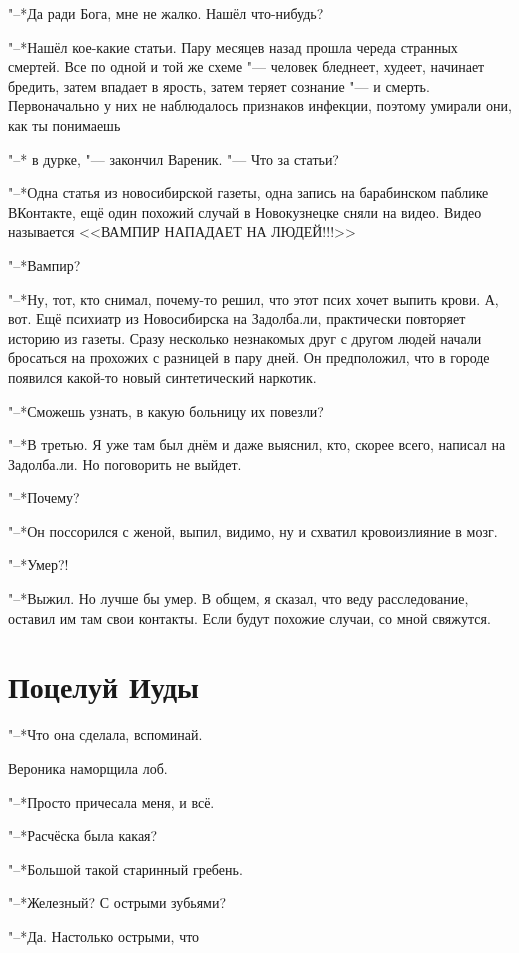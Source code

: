 "--*Да ради Бога, мне не жалко.
Нашёл что-нибудь?

"--*Нашёл кое-какие статьи.
Пару месяцев назад прошла череда странных смертей.
Все по одной и той же схеме "--- человек бледнеет, худеет, начинает бредить, затем впадает в ярость, затем теряет сознание "--- и смерть.
Первоначально у них не наблюдалось признаков инфекции, поэтому умирали они, как ты понимаешь\ldotst

"--* \ldotst в дурке, "--- закончил Вареник.
"--- Что за статьи?

"--*Одна статья из новосибирской газеты, одна запись на барабинском паблике ВКонтакте, ещё один похожий случай в Новокузнецке сняли на видео.
Видео называется <<ВАМПИР НАПАДАЕТ НА ЛЮДЕЙ!!!>>

"--*Вампир?

"--*Ну, тот, кто снимал, почему-то решил, что этот псих хочет выпить крови.
А, вот.
Ещё психиатр из Новосибирска на Задолба.ли, практически повторяет историю из газеты.
Сразу несколько незнакомых друг с другом людей начали бросаться на прохожих с разницей в пару дней.
Он предположил, что в городе появился какой-то новый синтетический наркотик.

"--*Сможешь узнать, в какую больницу их повезли?

"--*В третью.
Я уже там был днём и даже выяснил, кто, скорее всего, написал на Задолба.ли.
Но поговорить не выйдет.

"--*Почему?

"--*Он поссорился с женой, выпил, видимо, ну и схватил кровоизлияние в мозг.

"--*Умер?!

"--*Выжил.
Но лучше бы умер.
В общем, я сказал, что веду расследование, оставил им там свои контакты.
Если будут похожие случаи, со мной свяжутся.

\section{Поцелуй Иуды}

"--*Что она сделала, вспоминай.

Вероника наморщила лоб.

"--*Просто причесала меня, и всё.

"--*Расчёска была какая?

"--*Большой такой старинный гребень.

"--*Железный?
С острыми зубьями?

"--*Да.
Настолько острыми, что\ldotst

